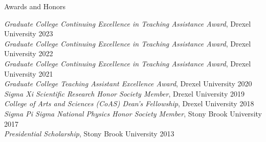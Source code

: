 \documentclass{resume} %
\begin{document}
\begin{rSection}{Awards and Honors}

 \textit{Graduate College Continuing Excellence in Teaching Assistance Award}, Drexel University \hfill{2023} \\
\textit{Graduate College Continuing Excellence in Teaching Assistance Award}, Drexel University \hfill{2022} \\
\textit{Graduate College Continuing Excellence in Teaching Assistance Award}, Drexel University \hfill{2021} \\
\textit{Graduate College Teaching Assistant Excellence Award}, Drexel University \hfill{2020} \\
\textit{Sigma Xi Scientific Research Honor Society Member}, Drexel University \hfill{2019}\\
\textit{College of Arts and Sciences (CoAS) Dean's Fellowship}, Drexel University \hfill {2018}\\
\textit{Sigma Pi Sigma National Physics Honor Society Member}, Stony Brook University \hfill{2017}\\
\textit{Presidential Scholarship}, Stony Brook University \hfill {2013}

\end{rSection}

\end{document}
